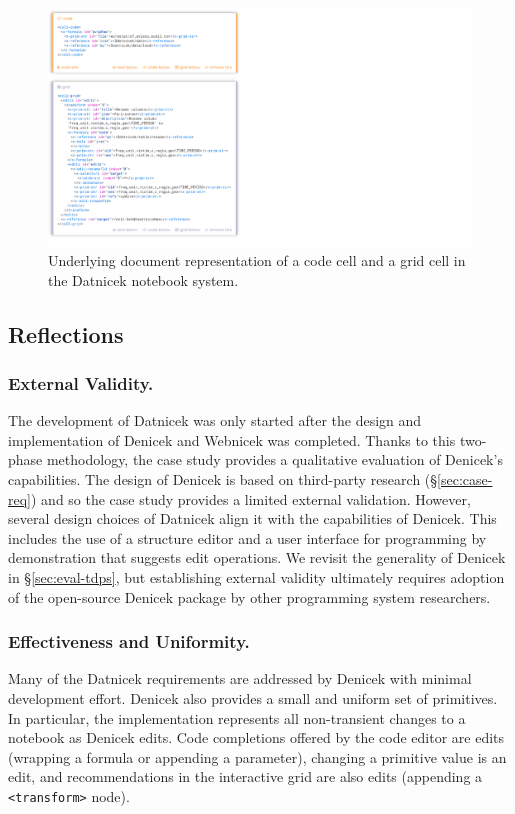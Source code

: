 \documentclass[sigconf]{acmart}
\newcommand{\diff}[1]{{#1}}
\newcommand{\note}[1]{}
\begin{document}
\begin{figure}[t]
\includegraphics[width=0.9\columnwidth,clip,trim=0cm 0.7cm 18.5cm 0.2cm]{fig/source.pdf}
\caption{Underlying document representation of a code cell and a grid cell in the Datnicek
notebook system.}
\label{fig:source}
\end{figure}


\subsection{Reflections}
\label{sec:case-reflection}

\subsubsection*{External Validity.}
The development of Datnicek was only started after the design and implementation of Denicek and
Webnicek was completed. Thanks to this two-phase methodology, the case study provides
a qualitative evaluation of Denicek's capabilities. \diff{The design of Denicek is based
on third-party research (\S\ref{sec:case-req}) and so the case study provides a limited external
validation. However, several design choices of Datnicek align it with the capabilities of Denicek.
This includes the use of a structure editor and
a user interface for programming by demonstration that suggests edit operations. We revisit the
generality of Denicek in \S\ref{sec:eval-tdps}, but establishing external validity ultimately
requires adoption of the open-source Denicek package by other programming system researchers.}
\note{Added discussion on external validity - although this is necessarilly limited.}

\subsubsection*{Effectiveness and Uniformity.}
Many of the Datnicek requirements are addressed by Denicek with minimal development
effort. Denicek also provides a small and uniform set of primitives. In particular,
the implementation represents all non-transient changes to a notebook as Denicek edits.
Code completions offered by the code editor are edits (wrapping a formula or appending a parameter),
changing a primitive value is an edit, and recommendations in the interactive grid are also edits
(appending a {\small\texttt{<transform>}} node).
\end{document}
